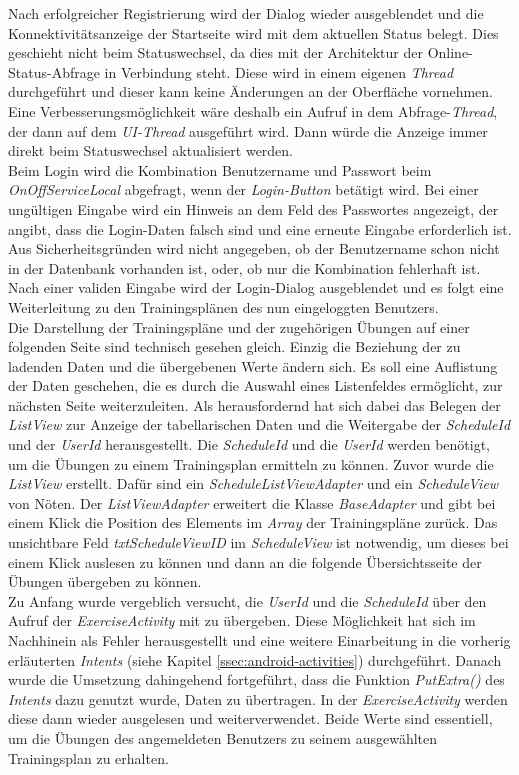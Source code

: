 Nach erfolgreicher Registrierung wird der Dialog wieder ausgeblendet und die Konnektivitätsanzeige der Startseite wird mit dem aktuellen Status belegt. Dies geschieht nicht beim Statuswechsel, da dies mit der Architektur der Online-Status-Abfrage in Verbindung steht. Diese wird in einem eigenen \textit{Thread} durchgeführt und dieser kann keine Änderungen an der Oberfläche vornehmen. Eine Verbesserungsmöglichkeit wäre deshalb ein Aufruf in dem Abfrage-\textit{Thread}, der dann auf dem \textit{UI-Thread} ausgeführt wird. Dann würde die Anzeige immer direkt beim Statuswechsel aktualisiert werden.\\
Beim Login wird die Kombination Benutzername und Passwort beim \textit{OnOffServiceLocal} abgefragt, wenn der \textit{Login-Button} betätigt wird. Bei einer ungültigen Eingabe wird ein Hinweis an dem Feld des Passwortes angezeigt, der angibt, dass die Login-Daten falsch sind und eine erneute Eingabe erforderlich ist. Aus Sicherheitsgründen wird nicht angegeben, ob der Benutzername schon nicht in der Datenbank vorhanden ist, oder, ob nur die Kombination fehlerhaft ist. Nach einer validen Eingabe wird der Login-Dialog ausgeblendet und es folgt eine Weiterleitung zu den Trainingsplänen des nun eingeloggten Benutzers.\\
Die Darstellung der Trainingspläne und der zugehörigen Übungen auf einer folgenden Seite sind technisch gesehen gleich. Einzig die Beziehung der zu ladenden Daten und die übergebenen Werte ändern sich. Es soll eine Auflistung der Daten geschehen, die es durch die Auswahl eines Listenfeldes ermöglicht, zur nächsten Seite weiterzuleiten. Als herausfordernd hat sich dabei das Belegen der \textit{ListView} zur Anzeige der tabellarischen Daten und die Weitergabe der \textit{ScheduleId} und der \textit{UserId} herausgestellt. Die \textit{ScheduleId} und die \textit{UserId} werden benötigt, um die Übungen zu einem Trainingsplan ermitteln zu können. Zuvor wurde die \textit{ListView} erstellt. Dafür sind ein \textit{ScheduleListViewAdapter} und ein \textit{ScheduleView} von Nöten. Der \textit{ListViewAdapter} erweitert die Klasse \textit{BaseAdapter} und gibt bei einem Klick die Position des Elements im \textit{Array} der Trainingspläne zurück. Das unsichtbare Feld \textit{txtScheduleViewID} im \textit{ScheduleView} ist notwendig, um dieses bei einem Klick auslesen zu können und dann an die folgende Übersichtsseite der Übungen übergeben zu können.\\
Zu Anfang wurde vergeblich versucht, die \textit{UserId} und die \textit{ScheduleId} über den Aufruf der \textit{ExerciseActivity} mit zu übergeben. Diese Möglichkeit hat sich im Nachhinein als Fehler herausgestellt und eine weitere Einarbeitung in die vorherig erläuterten \textit{Intents} (siehe Kapitel \ref{ssec:android-activities}) durchgeführt. Danach wurde die Umsetzung dahingehend fortgeführt, dass die Funktion \textit{PutExtra()} des \textit{Intents} dazu genutzt wurde, Daten zu übertragen. In der \textit{ExerciseActivity} werden diese dann wieder ausgelesen und weiterverwendet. Beide Werte sind essentiell, um die Übungen des angemeldeten Benutzers zu seinem ausgewählten Trainingsplan zu erhalten.\\
